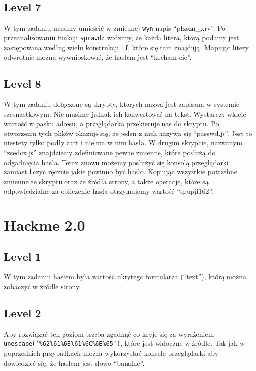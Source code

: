 \documentclass[11pt]{article}
\begin{document}
\subsection{Level 7}

W tym zadaniu musimy umieścić w zmiennej \texttt{wyn} napis ``plxszn\_xrv''. Po przeanalizowaniu funkcji \texttt{sprawdz} widzimy, że każda litera, którą podamy jest zastępowana według wielu konstrukcji \texttt{if}, które się tam znajdują. Mapując litery odwrotnie można wywnioskować, że hasłem jest ``kocham cie''.

\subsection{Level 8}

W tym zadaniu dołączone są skrypty, których nazwa jest zapisana w systemie szesnastkowym. Nie musimy jednak ich konwertować na tekst. Wystarczy wkleić wartość w pasku adresu, a przeglądarka przekieruje nas do skryptu. Po otworzeniu tych plików okazuje się, że jeden z nich nazywa się ``passwd.js''. Jest to niestety tylko podły żart i nie ma w nim hasła. W drugim skrypcie, nazwanym ``zsedcx.js'' znajdziemy zdefiniowane pewne zmienne, które posłużą do odgadnięcia hasła. Teraz znowu możemy posłużyć się konsolą przeglądarki zamiast liczyć ręcznie jakie powinno być hasło. Kopiując wszystkie potrzebne zmienne ze skryptu oraz ze źródła strony, a także operacje, które są odpowiedzialne za obliczenie hasła otrzymujemy wartość ``qrupjf162''.

\section{Hackme 2.0}

\subsection{Level 1}

W tym zadaniu hasłem była wartość ukrytego formularza (``text''), którą można zobaczyć w źródle strony.

\subsection{Level 2}

Aby rozwiązać ten poziom trzeba zgadnąć co kryje się za wyrażeniem \texttt{unescape('\%62\%61\%6E\%61\%6C\%6E\%65')}, które jest widoczne w źródle. Tak jak w poprzednich przypadkach można wykorzystać konsolę przeglądarki aby dowiedzieć się, że hasłem jest słowo ``banalne''.
\end{document}
